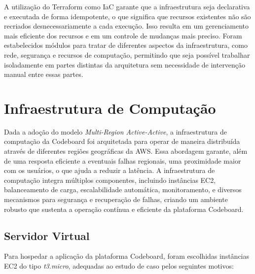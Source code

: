 A utilização do Terraform como IaC garante que a infraestrutura seja declarativa e executada de forma idempotente, o que significa que recursos existentes não são recriados desnecessariamente a cada execução. Isso resulta em um gerenciamento mais eficiente dos recursos e em um controle de mudanças mais preciso. Foram estabelecidos módulos para tratar de diferentes aspectos da infraestrutura, como rede, segurança e recursos de computação, permitindo que seja possível trabalhar isoladamente em partes distintas da arquitetura sem necessidade de intervenção manual entre essas partes.


\section{Infraestrutura de Computação}

Dada a adoção do modelo \emph{Multi-Region Active-Active}, a infraestrutura de computação da Codeboard foi arquitetada para operar de maneira distribuída através de diferentes regiões geográficas da AWS. Essa abordagem garante, além de uma resposta eficiente a eventuais falhas regionais, uma proximidade maior com os usuários, o que ajuda a reduzir a latência. A infraestrutura de computação integra múltiplos componentes, incluindo instâncias EC2, balanceamento de carga, escalabilidade automática, monitoramento, e diversos mecanismos para segurança e recuperação de falhas, criando um ambiente robusto que sustenta a operação contínua e eficiente da plataforma Codeboard.

\subsection{Servidor Virtual}

Para hospedar a aplicação da plataforma Codeboard, foram escolhidas instâncias EC2 do tipo \emph{t3.micro}, adequadas ao estudo de caso pelos seguintes motivos: 


